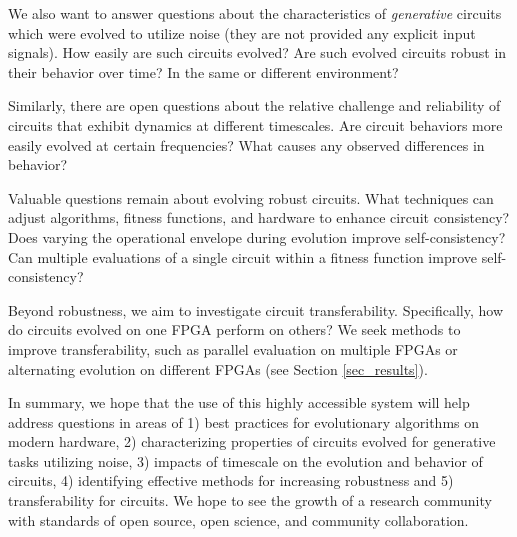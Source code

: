 \documentclass{ieeeaccess}
\begin{document}
We also want to answer questions about the characteristics of \textit{generative} circuits which were evolved to utilize noise (they are not provided any explicit input signals). How easily are such circuits evolved? Are such evolved circuits robust in their behavior over time? In the same or different environment?

Similarly, there are open questions about the relative challenge and reliability of circuits that exhibit dynamics at different timescales. Are circuit behaviors more easily evolved at certain frequencies? %
What causes any observed differences in behavior? %

Valuable questions remain about evolving robust circuits. What techniques can adjust algorithms, fitness functions, and hardware to enhance circuit consistency? Does varying the operational envelope during evolution improve self-consistency? Can multiple evaluations of a single circuit within a fitness function improve self-consistency?

Beyond robustness, we aim to investigate circuit transferability. Specifically, how do circuits evolved on one FPGA perform on others? We seek methods to improve transferability, such as parallel evaluation on multiple FPGAs or alternating evolution on different FPGAs (see Section \ref{sec_results}). %




In summary, we hope that the use of this highly accessible system will help address questions in areas of 1) best practices for evolutionary algorithms on modern hardware, 2) characterizing properties of circuits evolved for generative tasks utilizing noise,  3) impacts of timescale on the evolution and behavior of circuits, 4) identifying effective methods for increasing robustness and 5) transferability for circuits. %
We hope to see the growth of a research community with standards of open source, open science, and community collaboration. 
\end{document}
